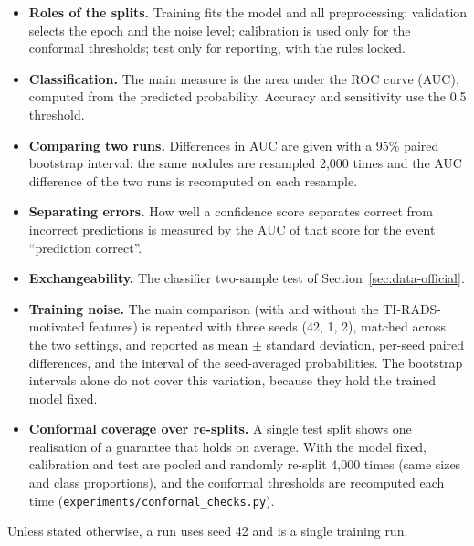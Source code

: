 \begin{itemize}
  \item \textbf{Roles of the splits.} Training fits the model and all preprocessing; validation
        selects the epoch and the noise level; calibration is used only for the conformal
        thresholds; test only for reporting, with the rules locked.
  \item \textbf{Classification.} The main measure is the area under the ROC curve (AUC), computed
        from the predicted probability. Accuracy and sensitivity use the 0.5 threshold.
  \item \textbf{Comparing two runs.} Differences in AUC are given with a 95\% paired bootstrap
        interval: the same nodules are resampled 2,000 times and the AUC difference of the two
        runs is recomputed on each resample.
  \item \textbf{Separating errors.} How well a confidence score separates correct from incorrect
        predictions is measured by the AUC of that score for the event ``prediction correct''.
  \item \textbf{Exchangeability.} The classifier two-sample test of Section~\ref{sec:data-official}.
  \item \textbf{Training noise.} The main comparison (with and without the TI-RADS-motivated
        features) is repeated with three seeds (42, 1, 2), matched across the two settings, and
        reported as mean $\pm$ standard deviation, per-seed paired differences, and the interval
        of the seed-averaged probabilities. The bootstrap intervals alone do not cover this
        variation, because they hold the trained model fixed.
  \item \textbf{Conformal coverage over re-splits.} A single test split shows one realisation of
        a guarantee that holds on average. With the model fixed, calibration and test are pooled
        and randomly re-split 4,000 times (same sizes and class proportions), and the conformal
        thresholds are recomputed each time (\texttt{experiments/conformal\_checks.py}).
\end{itemize}

Unless stated otherwise, a run uses seed 42 and is a single training run.
